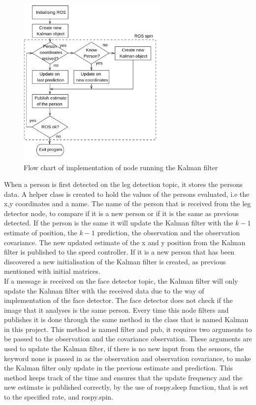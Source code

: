 \begin{figure}[H]
    \centering
    \includegraphics[width=0.65\textwidth]{figures/flow_pykalman.png}
    \caption{Flow chart of implementation of node running the Kalman filter}
    \label{fig:flow_pykalman}
\end{figure}

When a person is first detected on the leg detection topic, it stores the persons data. A helper class is created to hold the values of the persons evaluated, i.e the x,y coordinates and a name. The name of the person that is received from the leg detector node, to compare if it is a new person or if it is the same as previous detected. If the person is the same it will update the Kalman filter with the $k-1$ estimate of position, the $k-1$ prediction, the observation and the observation covariance. The new updated estimate of the x and y position from the Kalman filter is published to the speed controller. If it is a new person that has been discovered a new initialisation of the Kalman filter is created, as previous mentioned with initial matrices.\\
If a message is received on the face detector topic, the Kalman filter will only update the Kalman filter with the received data due to the way of implementation of the face detector. The face detector does not check if the image that it analyses is the same person. Every time this node filters and publishes it is done through the same method in the class that is named Kalman in this project. This method is named filter and pub, it requires two arguments to be passed to the observation and the covariance observation. These arguments are used to update the Kalman filter, if there is no new input from the sensors, the keyword none is passed in as the observation and observation covariance, to make the Kalman filter only update in the previous estimate and prediction. This method keeps track of the time and ensures that the update frequency and the new estimate is published correctly, by the use of rospy.sleep function, that is set to the specified rate, and rospy.spin.